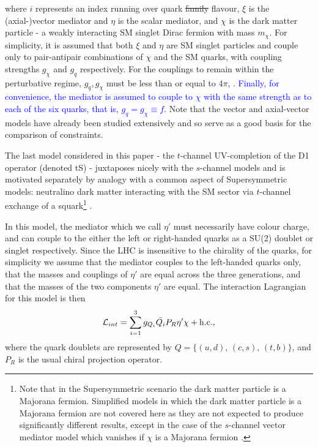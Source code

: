 \begin{flushleft}
where $i$ represents an index running over quark \st{family} flavour, $\xi$ is the (axial-)vector mediator and $\eta$ is the scalar mediator, and $\chi$ is the dark matter particle - a weakly interacting SM singlet Dirac fermion with mass $m_{\chi}$.  For simplicity, it is assumed that both $\xi$ and $\eta$ are SM singlet particles and couple only to pair-antipair combinations of $\chi$ and the SM quarks, with coupling strengths $g_{\chi}$ and $g_q$ respectively. For the couplings to remain within the perturbative regime, $g_{q},g_{\chi}$ must be less than or equal to $4\pi$,  \cite{ValidEFT}. \textcolor{blue}{Finally, for convenience, the mediator is assumed to couple to $\chi$ with the same strength as to each of the six quarks, that is, $g_{q} = g_{\chi} \equiv f$.} Note that the vector and axial-vector models have already been studied extensively \cite{Buchmueller:2014yoa, Chatrchyan:2013qha, Aad:2012hf, Harris:2014hga} and so serve as a good basis for the comparison of constraints. 

\hspace{1cm}The last model considered in this paper - the $t$-channel UV-completion of the D1 operator (denoted tS) - juxtaposes nicely with the $s$-channel models and is motivated separately by analogy with a common aspect of Supersymmetric models: neutralino dark matter interacting with the SM sector via $t$-channel exchange of a squark\footnote{Note that in the Supersymmetric scenario the dark matter particle is a Majorana fermion. Simplified models in which the dark matter particle is a Majorana fermion are not covered here as they are not expected to produce significantly different results, except in the case of the $s$-channel vector mediator model which vanishes if $\chi$ is a Majorana fermion \cite{METSig}.} \cite{SUSYDM}. 

In this model, the mediator which we call $\eta'$ must necessarily have colour charge, and can couple to the either the left or right-handed quarks as a SU(2) doublet or singlet respectively. Since the LHC is insensitive to the chirality of the quarks, for simplicity we assume that the mediator couples to the left-handed quarks only, that the masses and couplings of $\eta'$ are equal across the three generations, and that the masses of the two components $\eta'$ are equal. %
%
The interaction Lagrangian for this model is then
\begin{equation}
\label{L_int_tS}
\mathcal{L}_{int} = \sum_{i=1}^3 g_{Q_i} \bar{Q_i} P_R \eta' \chi + {\rm h.c.},
\end{equation}
where the quark doublets are represented by $Q = \{ (u,d), \, (c, s), \, (t, b) \}$, and $P_R$ is the usual chiral projection operator. 


\end{flushleft}
